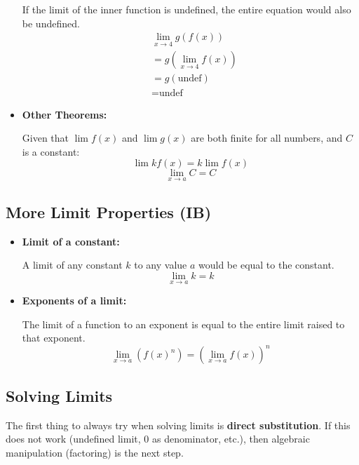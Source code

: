 \documentclass[12pt]{article}
\begin{document}
\begin{itemize}
          If the limit of the inner function is undefined, the entire equation would also be undefined.
          \begin{align*}
               & \lim_{x \to 4} g\left( f(x) \right)   \\
               & = g\left( \lim_{x \to 4} f(x) \right) \\
               & = g(\text{undef})                     \\
               & = \text{undef}
          \end{align*}
          \smallskip

    \item \textbf{Other Theorems:}

          Given that $\lim f(x)$ and $\lim g(x)$ are both finite for all numbers, and $C$ is a constant:
          \[ \lim k f(x) = k \lim f(x) \]
          \[ \lim_{x \to a} C = C \]
          \smallskip
\end{itemize}

\begin{figure}[H]
    \begin{center}
        \caption[Figure 2]{}
        \label{fig:limproperties}
    \end{center}
\end{figure}

\subsection{More Limit Properties (IB)}

\begin{itemize}
    \item \textbf{Limit of a constant:}

    A limit of any constant $k$ to any value $a$ would be equal to the constant.
    \[ \lim_{x \to a} k = k \]
    \smallskip

    \item \textbf{Exponents of a limit:}

    The limit of a function to an exponent is equal to the entire limit raised to that exponent.
    \[ \lim_{x \to a} \left( f(x) ^ n \right) = \left( \lim_{x \to a} f(x) \right)^n \]
\end{itemize}

\subsection{Solving Limits}
The first thing to always try when solving limits is \textbf{direct substitution}. If this does not work (undefined limit, 0 as denominator, etc.), then algebraic manipulation (factoring) is the next step.
\end{document}
